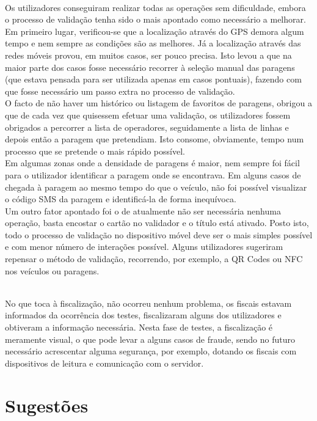 ~\\Os utilizadores conseguiram realizar todas as operações sem dificuldade, embora o processo de validação tenha sido o mais apontado como necessário a melhorar. 
\\Em primeiro lugar, verificou-se que a localização através do GPS demora algum tempo e nem sempre as condições são as melhores. Já a localização através das redes móveis provou, em muitos casos, ser pouco precisa. Isto levou a que na maior parte dos casos fosse necessário recorrer à seleção manual das paragens (que estava pensada para ser utilizada apenas em casos pontuais), fazendo com que fosse necessário um passo extra no processo de validação.
\\O facto de não haver um histórico ou listagem de favoritos de paragens, obrigou a que de cada vez que quisessem efetuar uma validação, os utilizadores fossem obrigados a percorrer a lista de operadores, seguidamente a lista de linhas e depois então a paragem que pretendiam. Isto consome, obviamente, tempo num processo que se pretende o mais rápido possível.
\\Em algumas zonas onde a densidade de paragens é maior, nem sempre foi fácil para o utilizador identificar a paragem onde se encontrava. Em alguns casos de chegada à paragem ao mesmo tempo do que o veículo, não foi possível visualizar o código SMS da paragem e identificá-la de forma inequívoca.
\\Um outro fator apontado foi o de atualmente não ser necessária nenhuma operação, basta encostar o cartão no validador e o título está ativado. Posto isto, todo o processo de validação no dispositivo móvel deve ser o mais simples possível e com menor número de interações possível. Alguns utilizadores sugeriram repensar o método de validação, recorrendo, por exemplo, a QR Codes ou NFC nos veículos ou paragens.

~\\No que toca à fiscalização, não ocorreu nenhum problema, os fiscais estavam informados da ocorrência dos testes, fiscalizaram alguns dos utilizadores e obtiveram a informação necessária. Nesta fase de testes, a fiscalização é meramente visual, o que pode levar a alguns casos de fraude, sendo no futuro necessário acrescentar alguma segurança, por exemplo, dotando os fiscais com dispositivos de leitura e comunicação com o servidor.

\section{Sugestões}

